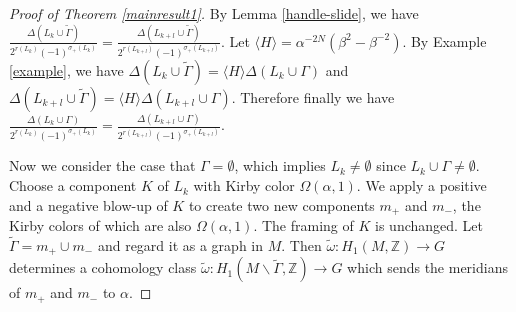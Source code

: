 \documentclass[12pt]{amsart}
\begin{document}
\begin{proof}[Proof of Theorem \ref{mainresult1}]
By Lemma \ref{handle-slide}, we have $\frac{\Delta (L_k\cup \tilde{\Gamma})}{2^{r(L_k)}(-1)^{\sigma_+(L_k)}}=\frac{\Delta (L_{k+l}\cup \tilde{\Gamma})}{2^{r(L_{k+l})}(-1)^{\sigma_+(L_{k+l})}}$. Let $\langle H\rangle=\alpha^{-2N}(\beta^2-\beta^{-2})$. By Example \ref{example}, we have $\Delta (L_k\cup \tilde{\Gamma})=\langle H\rangle \Delta (L_k\cup \Gamma)$ and $\Delta (L_{k+l}\cup \tilde{\Gamma})=\langle H\rangle \Delta (L_{k+l}\cup \Gamma)$. Therefore finally we have $\frac{\Delta (L_k\cup \Gamma)}{2^{r(L_k)}(-1)^{\sigma_+(L_k)}}=\frac{\Delta (L_{k+l}\cup \Gamma)}{2^{r(L_{k+l})}(-1)^{\sigma_+(L_{k+l})}}$.

Now we consider the case that $\Gamma=\emptyset$, which implies $L_k\neq \emptyset$ since $L_k\cup \Gamma\neq \emptyset$. Choose a component $K$ of $L_k$ with Kirby color $\Omega (\alpha, 1)$. We apply a positive and a negative blow-up of $K$ to create two new components $m_+$ and $m_{-}$, the Kirby colors of which are also $\Omega (\alpha, 1)$. The framing of $K$ is unchanged. Let $\tilde{\Gamma}=m_+\cup m_-$ and regard it as a graph in $M$. Then $\tilde{\omega}: H_1(M, \mathbb{Z}) \to G$ determines a cohomology class $\tilde{\omega}: H_1(M\backslash \tilde{\Gamma}, \mathbb{Z}) \to G$ which sends the meridians of $m_+$ and $m_-$ to $\alpha$.


\end{proof}
\end{document}

